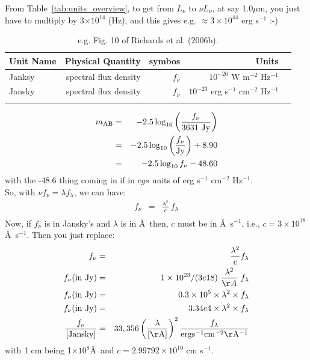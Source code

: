 \documentclass[11pt,a4paper]{article}
\begin{document}
From Table~\ref{tab:units_overview}, to get from $L_{\nu}$ to $\nu L_{\nu}$, at say 1.0$\mu$m, you just have to multiply by
3$\times10^{14}$ (Hz), and this gives e.g. $\approx3\times10^{44}$ erg s$^{-1}$ :-) 

\begin{table}
  \begin{center}
    \setlength{\tabcolsep}{4pt}
    \begin{tabular}{lrrrl}
      \hline       \hline
      Unit Name   & Physical Quantity & symbos & Units     \\
      \hline
      Janksy & spectral flux density &  $f_{\nu}$ & $10^{-26}$ W                  m$^{-2}$ Hz$^{-1}$  \\
     Jansky  & spectral flux density &  $f_{\nu}$  & $10^{-23}$ erg s$^{-1}$ cm$^{-2}$ Hz$^{-1}$ \\
      \hline       \hline
    \label{tab:The_LRG_numbers}
    \end{tabular}
    \caption{e.g. Fig. 10 of Richards et al. (2006b).}
  \end{center}
\end{table}


\begin{eqnarray}
  m_{\rm AB} & =  & -2.5 \log_{10} \left(  \frac{f_{\nu}}{3631 \ {\rm Jy}} \right) \\
                 & =  & -2.5 \log_{10} \left(  \frac{f_{\nu}}{  {\rm Jy}} \right) + 8.90 \\
                 & =  &-2.5 \log_{10} f_{\nu} - 48.60 
\end{eqnarray}
with the -48.6 thing coming in if in $cgs$ units of erg s$^{-1}$ cm$^{-2}$ Hz$^{-1}$.\\

\noindent
So, with $\nu  f_{\nu}  = \lambda f_{\lambda}$, we can have: 
\begin{eqnarray}
  f_{\nu}              & = &  \frac{\lambda^{2}}{c} \ f_{\lambda}\\
\end{eqnarray}
Now, if $f_{\nu}$ is in Jansky's and $\lambda$ is in \AA\, then, 
$c$ must be in \AA\ s$^{-1}$, i.e.,  $c = 3\times10^{18}$ \AA\ s$^{-1}$.  
Then you just replace:
\begin{eqnarray}
  f_{\nu}                      & = &  \frac{\lambda^{2}}{c} f_{\lambda}\\
  f_{\nu} {\rm (in\ Jy)} & = & 1  \times 10^{23}/(3e18) \ \frac{\lambda^{2}}{\AA} \ f_{\lambda}\\
  f_{\nu} {\rm (in\ Jy)} & = & 0.3 \times10^{5} \times \lambda^{2} \times f_{\lambda} \\ 
  f_{\nu} {\rm (in\ Jy)} & = & 3.34e4 \times \lambda^{2} \times f_{\lambda} \\
  \frac{f_{\nu}}{ [ {\rm Jansky} ] }  & = & 33,356 \left( \frac{\lambda}{ [ {\rm \AA} ] } \right)^{2} \frac{f_{\lambda}} {\rm erg s^{-1} cm^{-2}  \AA^{-1}} 
\end{eqnarray}
with 1 cm being 1$\times10^{8}$\AA\ and $c=2.99792\times10^{10}$ cm s$^{-1}$. \\
\end{document}
